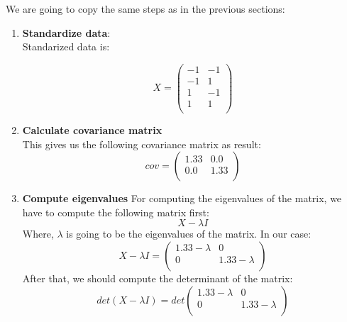 \documentclass[12pt]{article}
\begin{document}
We are going to copy the same steps as in the previous sections:
\begin{enumerate}
    \item \textbf{Standardize data}: \\
    Standarized data is:
    
    \begin{equation}
    X =
        \begin{pmatrix}
         -1 & -1 \\
         -1 & 1 \\
         1 & -1 \\
         1 & 1 \\
        \end{pmatrix}
    \end{equation}
    
    \item \textbf{Calculate covariance matrix}\\
   
    This gives us the following covariance matrix as result:
    \begin{equation}
    cov =
        \begin{pmatrix}
         1.33 & 0.0 \\
         0.0 & 1.33 \\
        \end{pmatrix}
    \end{equation}
    \item \textbf{Compute eigenvalues}      
    For computing the eigenvalues of the matrix, we have to compute the following matrix first:
    \begin{equation}
        X - \lambda I
    \end{equation}
    Where, $\lambda$ is going to be the eigenvalues of the matrix. In our case:
    \begin{equation}
        X - \lambda I =
        \begin{pmatrix}
         1.33 - \lambda & 0 \\
          0 &1.33 - \lambda \\
        \end{pmatrix}
    \end{equation}
    After that, we should compute the determinant of the matrix:
    \begin{equation}
        det(X - \lambda I) = det\begin{pmatrix}
         1.33 - \lambda & 0 \\
          0 &1.33 - \lambda \\
        \end{pmatrix}
    \end{equation}


\end{enumerate}
\end{document}
